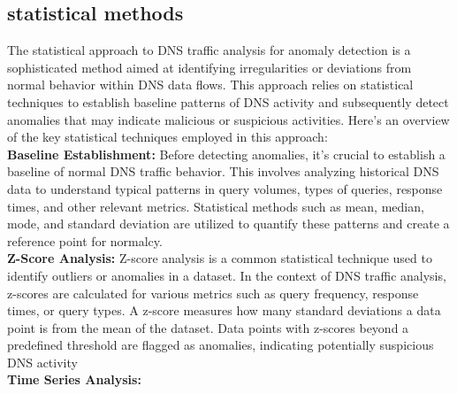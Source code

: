 \subsection{statistical methods}
The statistical approach to DNS traffic analysis for anomaly detection is a sophisticated method aimed at identifying irregularities or deviations from normal behavior within DNS data flows. This approach relies on statistical techniques to establish baseline patterns of DNS activity and subsequently detect anomalies that may indicate malicious or suspicious activities. Here's an overview of the key statistical techniques employed in this approach:\\
\textbf{Baseline Establishment:}
Before detecting anomalies, it's crucial to establish a baseline of normal DNS traffic behavior. This involves analyzing historical DNS data to understand typical patterns in query volumes, types of queries, response times, and other relevant metrics. Statistical methods such as mean, median, mode, and standard deviation are utilized to quantify these patterns and create a reference point for normalcy.\\
\textbf{Z-Score Analysis:}
Z-score analysis is a common statistical technique used to identify outliers or anomalies in a dataset. In the context of DNS traffic analysis, z-scores are calculated for various metrics such as query frequency, response times, or query types. A z-score measures how many standard deviations a data point is from the mean of the dataset. Data points with z-scores beyond a predefined threshold are flagged as anomalies, indicating potentially suspicious DNS activity\\
\textbf{Time Series Analysis:}
